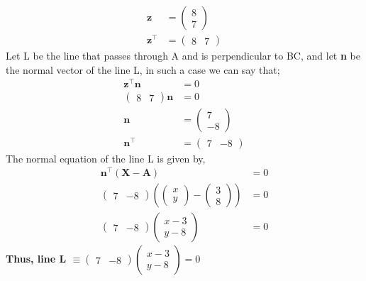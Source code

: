 \documentclass[journal,12pt,twocolumn]{IEEEtran}
\let\vec\mathbf
\newcommand{\myvec}[1]{\ensuremath{\begin{pmatrix}#1\end{pmatrix}}}
\begin{document}
\begin{enumerate}
\begin{align}
	\vec{z} &= \myvec{8 \\ 7}
	\\
	\vec{z}^{\top} &= \myvec{8 & 7}
    \end{align}
     Let L be the line that passes through A and is perpendicular to BC, and let \textbf{n} be the normal vector of the line L, in such a case we can say that;
     \begin{align}
	\vec{z}^{\top}\vec{n} &= 0
	\\
	\myvec{8 & 7}\vec{n} &= 0
	\\
	\vec{n} &= \myvec{7 \\ -8}
	\\
	\vec{n}^{\top} &= \myvec{7 & -8}
    \end{align}
    The normal equation of the line L is given by, 
    \begin{align}
	\vec{n}^{\top}(\vec{X} - \vec{A}) &= 0
	\\
	\myvec{7 & -8}(\myvec{x \\ y} - \myvec{3 \\ 8})&= 0
	\\
	\myvec{7 & -8}\myvec{x - 3 \\ y - 8} &= 0
    \end{align}
    \textbf{Thus, line L $\equiv \myvec{7 & -8}\myvec{x - 3 \\ y - 8} = 0$}
\end{enumerate}
\end{document}
